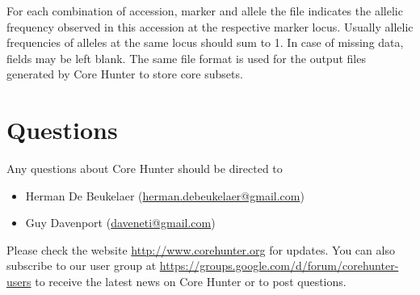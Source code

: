 \documentclass[a4paper, titlepage, 11pt]{article}
\begin{document}
For each combination of accession, marker and allele the file indicates the allelic frequency observed in this accession at the respective marker locus. Usually allelic frequencies of alleles at the same locus should sum to 1. In case of missing data, fields may be left blank. The same file format is used for the output files generated by Core Hunter to store core subsets.

\section{Questions}

Any questions about Core Hunter should be directed to
\begin{itemize}

	\item Herman De Beukelaer (\href{mailto:herman.debeukelaer@gmail.com}{herman.debeukelaer@gmail.com})

	\item Guy Davenport (\href{mailto:daveneti@gmail.com}{daveneti@gmail.com})

\end{itemize}

Please check the website \url{http://www.corehunter.org} for updates. You can also subscribe to our user group at \url{https://groups.google.com/d/forum/corehunter-users} to receive the latest news on Core Hunter or to post questions.
\end{document}
